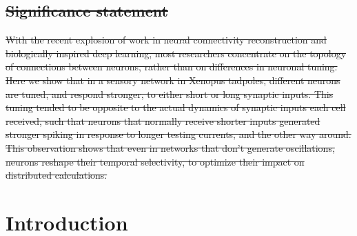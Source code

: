 \documentclass{article}
\providecommand{\DIFdeltex}[1]{{\protect\color{red}\sout{#1}}}                      %
\providecommand{\DIFdelbegin}{} %
\providecommand{\DIFdelend}{} %
\providecommand{\DIFdel}[1]{\texorpdfstring{\DIFdeltex{#1}}{}} %
\newcommand{\DIFscaledelfig}{0.5}
\newlength{\DIFdelgraphicswidth} %
\newlength{\DIFdelgraphicsheight} %
\newcommand{\DIFdelincludegraphics}[2][]{%
\sbox{\DIFdelgraphicsbox}{\DIFOincludegraphics[#1]{#2}}%
\settoboxwidth{\DIFdelgraphicswidth}{\DIFdelgraphicsbox} %
\settoboxtotalheight{\DIFdelgraphicsheight}{\DIFdelgraphicsbox} %
\scalebox{\DIFscaledelfig}{%
\parbox[b]{\DIFdelgraphicswidth}{\usebox{\DIFdelgraphicsbox}\\[-\baselineskip] \rule{\DIFdelgraphicswidth}{0em}}\llap{\resizebox{\DIFdelgraphicswidth}{\DIFdelgraphicsheight}{%
\setlength{\unitlength}{\DIFdelgraphicswidth}%
\begin{picture}(1,1)%
\thicklines\linethickness{2pt} %
{\color[rgb]{1,0,0}\put(0,0){\framebox(1,1){}}}%
{\color[rgb]{1,0,0}\put(0,0){\line( 1,1){1}}}%
{\color[rgb]{1,0,0}\put(0,1){\line(1,-1){1}}}%
\end{picture}%
}\hspace*{3pt}}} %
} %
\DeclareRobustCommand{\DIFdelbegin}{\DIFOdelbegin \let\includegraphics\DIFdelincludegraphics} %
\DeclareRobustCommand{\DIFdelend}{\DIFOaddend \let\includegraphics\DIFOincludegraphics} %
\begin{document}
\begin{flushleft}
\DIFdelend %

\DIFdelbegin \section*{\DIFdel{Significance statement}}
\DIFdel{With the recent explosion of work in neural connectivity reconstruction and biologically inspired deep learning, most researchers concentrate on the topology of connections between neurons, rather than on differences in neuronal tuning. Here we show that in a sensory network in Xenopus tadpoles, different neurons are tuned, and respond stronger, to either short or long synaptic inputs. This tuning tended to be opposite to the actual dynamics of synaptic inputs each cell received, such that neurons that normally receive shorter inputs generated stronger spiking in response to longer testing currents, and the other way around.
This observation shows that even in networks that don't generate oscillations, neurons reshape their temporal selectivity, to optimize their impact on distributed calculations. 
}\DIFdelend \bigskip

\end{flushleft} %

\section*{Introduction}
\end{document}
